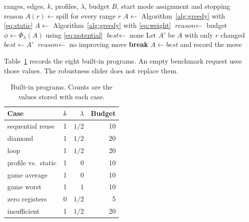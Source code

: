 \documentclass{ieeeaccess}
\begin{document}
\begin{algorithm}[t]
\caption{Potential search from a valid start}
\label{alg:game}
\begin{algorithmic}
\REQUIRE ranges, edges, $k$, profiles, $\lambda$, budget $B$, start mode
\ENSURE assignment and stopping reason
\STATE $A(r) \leftarrow \mathrm{spill}$ for every range $r$
\STATE $A \leftarrow$ Algorithm~\ref{alg:greedy} with \eqref{eq:static}
\ELSE
\STATE $A \leftarrow$ Algorithm~\ref{alg:greedy} with \eqref{eq:weight}
\ENDIF
\STATE $\textit{reason} \leftarrow$ budget
\STATE $\phi \leftarrow \Phi_\lambda(A)$ using \eqref{eq:potential}
\STATE $\textit{best} \leftarrow$ none
\STATE Let $A'$ be $A$ with only $r$ changed
\STATE $\textit{best} \leftarrow A'$
\ENDIF
\ENDIF
\ENDFOR
\ENDFOR
{}
\STATE $\textit{reason} \leftarrow$ no improving move
\STATE \textbf{break}
\ENDIF
\STATE $A \leftarrow \textit{best}$ and record the move
\ENDFOR
\end{algorithmic}
\end{algorithm}

Table~\ref{tab:suite} records the eight built-in programs.
An empty benchmark request uses those values.
The robustness slider does not replace them.

\begin{table}[t]
\caption{Built-in programs. Counts are the values stored with each case.}
\label{tab:suite}
\centering
\begin{tabular}{@{}lrrr@{}}
\toprule
Case & $k$ & $\lambda$ & Budget \\
\midrule
sequential reuse & 1 & $1/2$ & 10 \\
diamond & 1 & $1/2$ & 20 \\
loop & 1 & $1/2$ & 20 \\
profile vs.\ static & 1 & $0$ & 10 \\
game average & 1 & $0$ & 10 \\
game worst & 1 & $1$ & 10 \\
zero registers & 0 & $1/2$ & 5 \\
insufficient & 1 & $1/2$ & 20 \\
\bottomrule
\end{tabular}
\end{table}
\end{document}
